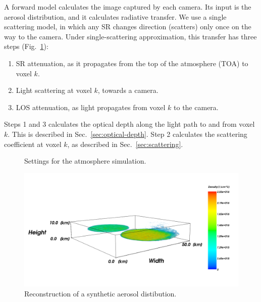 \documentclass[10pt,twocolumn,letterpaper]{article}
\begin{document}
A forward model calculates the image captured by each camera.
Its input is the aerosol distribution, and it calculates radiative
transfer. We use a single scattering model, in which any SR changes direction (scatters) 
only once on the way to the camera. 
Under single-scattering approximation, this transfer has three steps (Fig.~\ref{fig:settings}):
\begin{enumerate}
\item SR attenuation, as it propagates from the top of the atmosphere
  (TOA) to voxel $k$.
\item Light scattering at voxel $k$, towards a camera.
\item LOS attenuation, as light propagates from voxel $k$ to the camera.
\end{enumerate}
Steps 1 and 3 calculates the optical depth
along the light path to and from voxel $k$. This is described in Sec.~\ref{sec:optical-depth}.
Step 2 calculates the scattering coefficient at voxel $k$,
as described in Sec.~\ref{sec:scattering}.


\begin{figure}
  \centering {}
  
  \caption[Settings of the atmosphere simulation]{Settings for the
    atmosphere simulation.}
  \label{fig:settings}
\end{figure}




\begin{figure}
  \centering
    \includegraphics[width=\columnwidth]{images/front.png}
    \caption{Reconstruction of a synthetic aerosol distibution.}
  \label{fig:front}
\end{figure}
\end{document}
